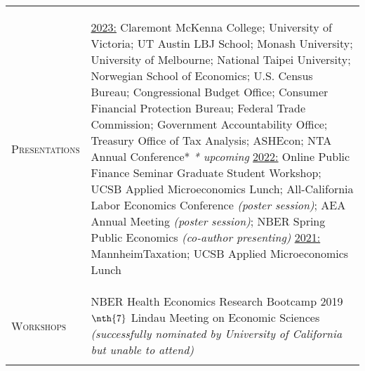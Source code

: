 \documentclass[11pt]{article}
\newcommand{\xspace}{19pt}
\begin{document}
\begin{tabularx}{\textwidth}{@{}Y Z@{}}
	\textsc{Presentations} & 
	\begin{minipage}[t]{1.55\linewidth}	
		\begin{flushleft}
			\uline{2023:} Claremont McKenna College; University of Victoria; UT Austin LBJ School; Monash University; University of Melbourne; National Taipei University; Norwegian School of Economics; U.S. Census Bureau; Congressional Budget Office; Consumer Financial Protection Bureau; Federal Trade Commission; Government Accountability Office; Treasury Office of Tax Analysis; ASHEcon; NTA Annual Conference* \newline  \textit{* upcoming}
			\vspace{10pt} \newline
			\uline{2022:} Online Public Finance Seminar Graduate Student Workshop; UCSB Applied Microeconomics Lunch; All-California Labor Economics Conference \textit{(poster session)}; AEA Annual Meeting \textit{(poster session)}; NBER Spring Public Economics \textit{(co-author presenting)}
			\vspace{10pt} \newline
			\uline{2021:} MannheimTaxation; UCSB Applied Microeconomics Lunch
		\end{flushleft}
	\end{minipage}
	\\ \addlinespace[\xspace] 
	
	\textsc{Workshops} & 
	NBER Health Economics Research Bootcamp \hfill 2019%
	\vspace{10pt} \newline
	$\nth{7}$ Lindau Meeting on Economic Sciences \newline \textit{(successfully nominated by University of California but unable to attend)} 
	\\ \addlinespace[\xspace] 
	

\end{tabularx}
\end{document}
